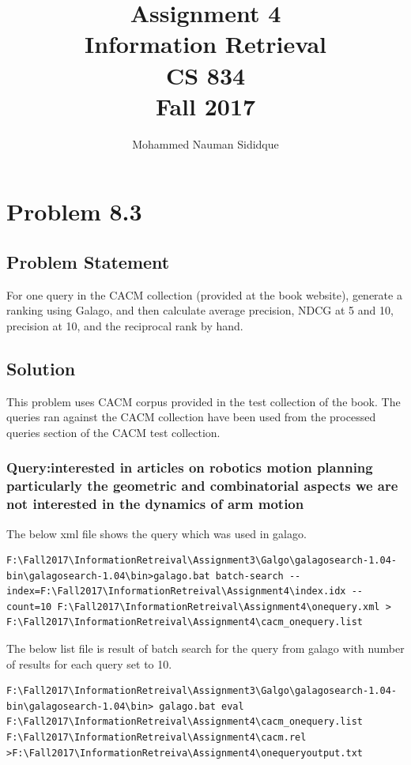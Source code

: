 \documentclass[12pt]{report}
\author{Mohammed Nauman Sididque}
\title{Assignment 4 \\Information Retrieval \\ CS 834 \\ Fall 2017 }
\begin{document}
\maketitle
\tableofcontents
\chapter{Problem 8.3}
\section{Problem Statement}
For one query in the CACM collection (provided at the book website), generate a ranking using Galago, and then calculate average precision, NDCG at 5 and 10, precision at 10, and the reciprocal rank by hand.
\section{Solution}
This problem uses CACM corpus provided in the test collection of the book. The queries ran against the CACM collection have been used from the processed queries section of the CACM test collection.\\

\subsection{Query:interested in articles on robotics  motion planning particularly the geometric and combinatorial aspects   we are not interested in the dynamics of arm motion}

The below xml file shows the query which was used in galago.\\


\begin{lstlisting}[style=DOS]
F:\Fall2017\InformationRetreival\Assignment3\Galgo\galagosearch-1.04-bin\galagosearch-1.04\bin>galago.bat batch-search --index=F:\Fall2017\InformationRetreival\Assignment4\index.idx --count=10 F:\Fall2017\InformationRetreival\Assignment4\onequery.xml > F:\Fall2017\InformationRetreival\Assignment4\cacm_onequery.list
\end{lstlisting}

The below list file is result of batch search for the query from galago with number of results for each query set to 10.


\begin{lstlisting}[style=DOS]
F:\Fall2017\InformationRetreival\Assignment3\Galgo\galagosearch-1.04-bin\galagosearch-1.04\bin> galago.bat eval F:\Fall2017\InformationRetreival\Assignment4\cacm_onequery.list  F:\Fall2017\InformationRetreival\Assignment4\cacm.rel >F:\Fall2017\InformationRetreiva\Assignment4\onequeryoutput.txt
\end{lstlisting}
\end{document}
